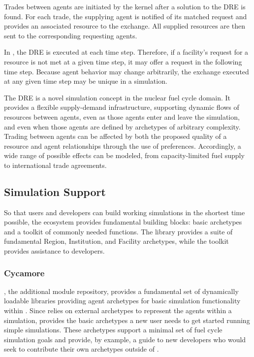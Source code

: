 Trades between agents are initiated by the \Cyclus kernel after a solution to
the \gls{DRE} is found. For each trade, the supplying agent is notified of its
matched request and provides an associated resource to the exchange. All
supplied resources are then sent to the corresponding requesting agents.

In \Cyclus, the \gls{DRE} is executed at each time step. Therefore, if a
facility's request for a resource is not met at a given time step, it may offer
a request in the following time step. Because agent behavior may change
arbitrarily, the exchange executed at any given time step may be unique in a
simulation.

The \gls{DRE} is a novel simulation concept in the nuclear fuel cycle domain. It
provides a flexible supply-demand infrastructure, supporting dynamic flows of
resources between agents, even as those agents enter and leave the simulation, and
even when those agents are defined by archetypes of arbitrary complexity. Trading
between agents can be affected by both the
proposed quality of a resource and agent relationships through the use of
preferences. Accordingly, a wide range of possible effects can be
modeled, from capacity-limited fuel supply to international trade agreements.

\subsection{Simulation Support}
So that users and developers can build working simulations in the shortest time
possible, the \Cyclus ecosystem provides fundamental building blocks: basic
archetypes and a toolkit of commonly needed functions.  The \Cycamore library
provides a suite of fundamental Region, Institution, and Facility archetypes,
while the \Cyclus toolkit provides assistance to developers.

\subsubsection{Cycamore}

\Cycamore \cite{carlsen_cycamore_2014}, the \Cyclus additional module
repository, provides a fundamental set of dynamically loadable libraries
providing agent archetypes for basic simulation
functionality within \Cyclus.  Since \Cyclus relies on external
archetypes to represent the agents within a simulation, \Cycamore provides the
basic archetypes a new user needs to get started running simple simulations.
These archetypes support a minimal set of fuel cycle simulation goals and
provide, by example, a guide to new developers who would seek to contribute
their own archetypes outside of \Cycamore.

